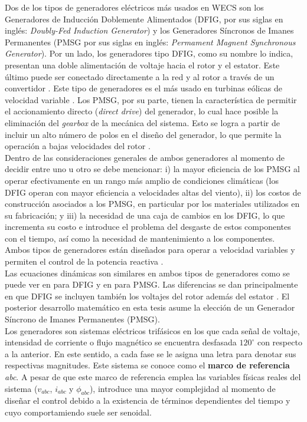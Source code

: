 {Dos de los tipos de generadores eléctricos más usados en WECS son los Generadores de Inducción Doblemente Alimentados (DFIG, por sus siglas en inglés: \emph{Doubly-Fed Induction Generator}) 
y los Generadores Síncronos de Imanes Permanentes (PMSG por sus siglas en inglés: \emph{Permament Magnent Synchronous Generator}). Por un lado, los generadores tipo DFIG, como 
su nombre lo indica, presentan una doble alimentación de voltaje hacia el rotor y el estator. Este último puede ser 
conectado directamente a la red y al rotor a través de un convertidor \cite{dahiya2019}. Este tipo de generadores es el más usado en turbinas eólicas de velocidad variable
\cite{dahiya2019,soltani2013}.
Los PMSG, por su parte, tienen la característica de permitir el accionamiento 
directo (\emph{direct drive}) del generador, lo cual hace posible la eliminación del \emph{gearbox} de la mecánica del sistema. Esto se logra a partir de incluir un alto número 
de polos en el diseño del generador, lo que permite la operación a bajas velocidades del rotor \cite{soltani2013, swibki2020}.
\\

Dentro de las consideraciones generales de ambos generadores al momento de decidir entre uno u otro se debe mencionar: i) la mayor eficiencia de los PMSG al operar efectivamente 
en un rango más amplio de condiciones climáticas (los DFIG operan con mayor eficiencia a velocidades altas del viento), ii) los costos de construcción asociados a los PMSG, 
en particular por los materiales utilizados en su fabricación; y iii) la necesidad de una caja de cambios en los DFIG, lo que incrementa su costo e introduce el problema del 
desgaste de estos componentes con el tiempo, así como la necesidad de mantenimiento a los componentes. 
Ambos tipos de generadores están diseñados  para operar a velocidad variables y permiten el control de 
la potencia reactiva \cite{dahiya2019, swibki2020,Lei2006,feijoo2000}. 
\\

Las ecuaciones dinámicas son similares en ambos 
tipos de generadores como se puede ver en \cite{Lei2006} para DFIG y en \cite{cisneros2020} para PMSG. 
Las diferencias se dan principalmente en que DFIG se incluyen también los voltajes del rotor además del estator \cite{Lei2006}.
El posterior desarrollo matemático en esta tesis asume la elección de un Generador Síncrono de Imanes 
Permanentes (PMSG).
\\

Los generadores son sistemas eléctricos trifásicos en los que cada señal de voltaje, intensidad de corriente 
o flujo magnético se encuentra desfasada $120^\circ$ con respecto a la anterior. En este sentido, a cada fase se le 
asigna una letra para denotar sus respectivas magnitudes. Este sistema se conoce como el \textbf{marco de referencia}
\emph{abc}. A pesar de que este marco de referencia emplea las variables físicas reales del sistema ($v_{abc}$, $i_{abc}$ y $\phi_{abc}$), 
introduce una mayor complejidad al momento de diseñar el control debido a la existencia de términos dependientes del 
tiempo y cuyo comportamiendo suele ser senoidal. 
\\

}
